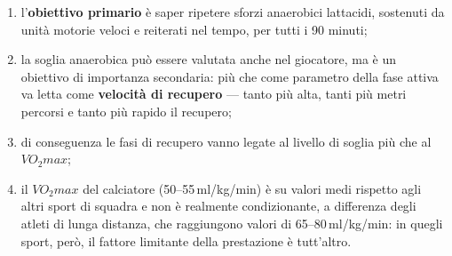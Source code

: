 \begin{enumerate}
  \item l'\textbf{obiettivo primario} è saper ripetere sforzi anaerobici lattacidi, sostenuti da
    unità motorie veloci e reiterati nel tempo, per tutti i 90 minuti;
  \item la soglia anaerobica può essere valutata anche nel giocatore, ma è un obiettivo di
    importanza secondaria: più che come parametro della fase attiva va letta come \textbf{velocità
    di recupero} --- tanto più alta, tanti più metri percorsi e tanto più rapido il recupero;
  \item di conseguenza le fasi di recupero vanno legate al livello di soglia più che al $VO_2max$;
  \item il $VO_2max$ del calciatore (50--55\,ml/kg/min) è su valori medi rispetto agli altri sport
    di squadra e non è realmente condizionante, a differenza degli atleti di lunga distanza, che
    raggiungono valori di 65--80\,ml/kg/min: in quegli sport, però, il fattore limitante della
    prestazione è tutt'altro.
\end{enumerate}
